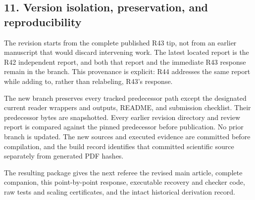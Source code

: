 \documentclass[11pt,letterpaper]{article}
\begin{document}
\subsection*{11. Version isolation, preservation, and reproducibility}


The revision starts from the complete published R43 tip, not from an earlier manuscript that would discard intervening work. The latest located report is the R42 independent report, and both that report and the immediate R43 response remain in the branch. This provenance is explicit: R44 addresses the same report while adding to, rather than relabeling, R43's response.



The new branch preserves every tracked predecessor path except the designated current reader wrappers and outputs, README, and submission checklist. Their predecessor bytes are snapshotted. Every earlier revision directory and review report is compared against the pinned predecessor before publication. No prior branch is updated. The new sources and executed evidence are committed before compilation, and the build record identifies that committed scientific source separately from generated PDF hashes.



The resulting package gives the next referee the revised main article, complete companion, this point-by-point response, executable recovery and checker code, raw tests and scaling certificates, and the intact historical derivation record.
\end{document}
